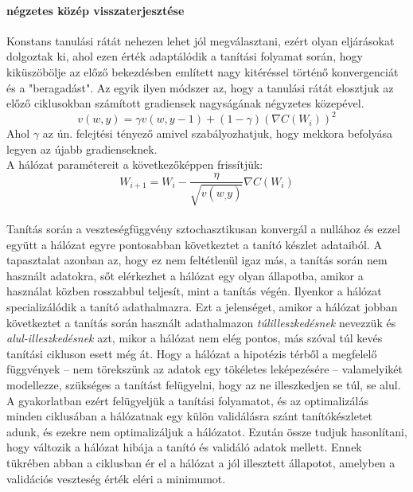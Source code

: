 \paragraph[RMSprop]{négzetes közép visszaterjesztése}
Konstans tanulási rátát nehezen lehet jól megválasztani, ezért olyan eljárásokat dolgoztak ki, ahol ezen érték adaptálódik a tanítási folyamat során, hogy kiküszöbölje az előző bekezdésben említett nagy kitéréssel történő konvergenciát és a "beragadást". Az egyik ilyen módszer az, hogy a tanulási rátát elosztjuk az előző ciklusokban számított gradiensek nagyságának négyzetes közepével.
$$ v(w,y) = \gamma v(w,y-1) +(1-\gamma)(\nabla C(W_i))^2 $$
Ahol $\gamma$ az ún. felejtési tényező amivel szabályozhatjuk, hogy mekkora befolyása legyen az újabb gradienseknek.\\
A hálózat paramétereit a következőképpen frissítjük:
$$ W_{i+1} = W_i - \frac{\eta}{\sqrt{v(w_,y)}} \nabla C(W_i) $$
\\
Tanítás során a veszteségfüggvény sztochasztikusan konvergál a nullához és ezzel együtt a hálózat egyre pontosabban következtet a tanító készlet adataiból. A tapasztalat azonban az, hogy ez nem feltétlenül igaz más, a tanítás során nem használt adatokra, sőt elérkezhet a hálózat egy olyan állapotba, amikor a használat közben rosszabbul teljesít, mint a tanítás végén. Ilyenkor a hálózat specializálódik a tanító adathalmazra. Ezt a jelenséget, amikor a hálózat jobban következtet a tanítás során használt adathalmazon \emph{túlilleszkedésnek} nevezzük és \emph{alul-illeszkedésnek} azt, mikor a hálózat nem elég pontos, más szóval túl kevés tanítási cikluson esett még át. Hogy a hálózat a hipotézis térből a megfelelő függvények -- nem törekszünk az adatok egy tökéletes leképezésére -- valamelyikét modellezze, szükséges a tanítást felügyelni, hogy az ne illeszkedjen se túl, se alul.
A gyakorlatban ezért felügyeljük a tanítási folyamatot, és az optimalizálás minden ciklusában a hálózatnak egy külön validálásra szánt tanítókészletet adunk, és ezekre nem optimalizáljuk a hálózatot. Ezután össze tudjuk hasonlítani, hogy változik a hálózat hibája a tanító és validáló adatok mellett. Ennek tükrében abban a ciklusban ér el a hálózat a jól illesztett állapotot, amelyben a validációs veszteség érték eléri a minimumot.

